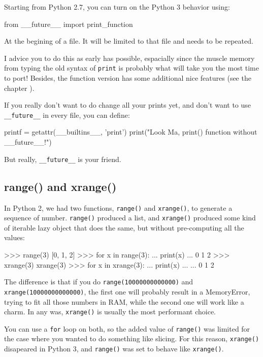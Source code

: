 Starting from Python 2.7, you can turn on the Python 3 behavior using:

\begin{py2and3}
from __future__ import print_function
\end{py2and3}

At the begining of a file. It will be limited to that file and needs to be repeated.

I advice you to do this as early has possible, espacially since the muscle memory from typing the old syntax of \lstinline{print} is probably what will take you the most time to port! Besides, the function version has some additional nice features (see the chapter ).

If you really don't want to do change all your prints yet, and don't want to use \lstinline{__future__} in every file, you can define:

\begin{py2and3}
printf = getattr(__builtins__, 'print')
print("Look Ma, print() function without __future__!")
\end{py2and3}

But really, \lstinline{__future__} is your friend.


\subsection{range() and xrange()}

In Python 2, we had two functions, \lstinline{range()} and \lstinline{xrange()}, to generate a sequence of number. \lstinline{range()} produced a list, and \lstinline{xrange()} produced some kind of iterable lazy object that does the same, but without pre-computing all the values:

\begin{py2}
>>> range(3)
[0, 1, 2]
>>> for x in range(3):
...     print(x)
...
0
1
2
>>> xrange(3)
xrange(3)
>>> for x in xrange(3):
...     print(x)
...
...
0
1
2
\end{py2}

The difference is that if you do \lstinline{range(10000000000000)} and \lstinline{xrange(10000000000000)}, the first one will probably result in a MemoryError, trying to fit all those numbers in RAM, while the second one will work like a charm. In any was, \lstinline{xrange()} is usually the most performant choice.

You can use a \lstinline{for} loop on both, so the added value of \lstinline{range()} was limited for the case where you wanted to do something like slicing. For this reason, \lstinline{xrange()} disapeared in Python 3, and \lstinline{range()} was set to behave like \lstinline{xrange()}.

